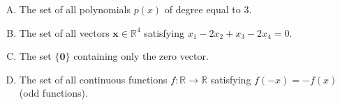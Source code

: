 \documentclass[12pt]{amsart}
\begin{document}
{\begin{enumerate}[(A)]
\item The set of all polynomials $p(x)$ of degree equal to 3.

\item The set of all vectors $\mathbf{x} \in \mathbb{R}^4$ satisfying $x_1 - 2x_2 + x_3 - 2x_4 = 0$.

\item The set $\{\mathbf{0}\}$ containing only the zero vector.

\item The set of all continuous functions $f: \mathbb{R} \to \mathbb{R}$ satisfying $f(-x) = -f(x)$ (odd functions).
\end{enumerate}

%
%
%
%
%

}
\end{document}
